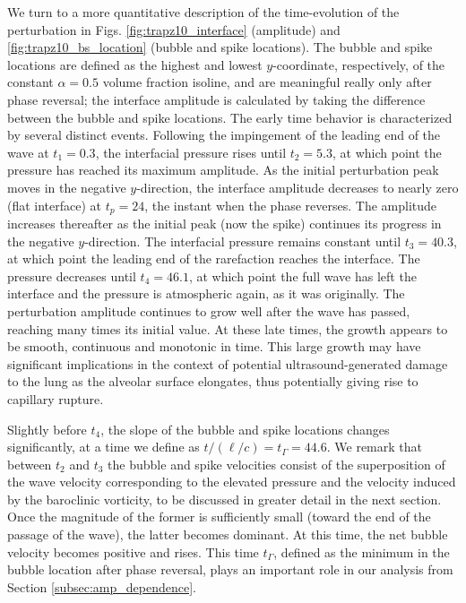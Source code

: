 \documentclass{jfm}%
\begin{document}
We turn to a more quantitative description of the time-evolution of
the perturbation in Figs. \ref{fig:trapz10_interface} (amplitude)
and \ref{fig:trapz10_bs_location} (bubble and spike locations). The
bubble and spike locations are defined as the highest and lowest
$y$-coordinate, respectively, of the constant $\alpha = 0.5$ volume
fraction isoline, and are meaningful really only after phase reversal;
the interface amplitude is calculated by taking the difference between
the bubble and spike locations. The early time behavior is
characterized by several distinct events.  Following the impingement
of the leading end of the wave at $t_1=0.3$, the interfacial pressure
rises until $t_2=5.3$, at which point the pressure has reached its
maximum amplitude.  As the initial perturbation peak moves in the
negative $y$-direction, the interface amplitude decreases to nearly
zero (flat interface) at $t_p=24$, the instant when the phase
reverses.  The amplitude increases thereafter as the initial peak (now
the spike) continues its progress in the negative $y$-direction.  The
interfacial pressure remains constant until $t_3=40.3$, at which point
the leading end of the rarefaction reaches the interface. The pressure
decreases until $t_4=46.1$, at which point the full wave has left the
interface and the pressure is atmospheric again, as it was originally.
The perturbation amplitude continues to grow well after the wave has
passed, reaching many times its initial value. At these late times,
the growth appears to be smooth, continuous and monotonic in
time. This large growth may have significant implications in the
context of potential ultrasound-generated damage to the lung as the
alveolar surface elongates, thus potentially giving rise to capillary
rupture.

Slightly before $t_4$, the slope of the bubble and spike locations
changes significantly, at a time we define as $t/(\ell/c)=t_\Gamma=44.6$. We
remark that between $t_2$ and $t_3$ the bubble and spike velocities
consist of the superposition of the wave velocity corresponding to the
elevated pressure and the velocity induced by the baroclinic
vorticity, to be discussed in greater detail in the next section.
Once the magnitude of the former is sufficiently small (toward the end
of the passage of the wave), the latter becomes dominant. At this
time, the net bubble velocity becomes positive and rises. This time
$t_\Gamma$, defined as the minimum in the bubble location after phase
reversal, plays an important role in our analysis from Section
\ref{subsec:amp_dependence}.
\end{document}
